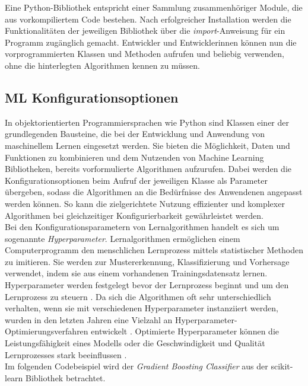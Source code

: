 \documentclass[german,bachelor]{swsLeipzig}
\begin{document}
Eine Python-Bibliothek entspricht einer Sammlung zusammenhöriger Module, die aus vorkompiliertem Code bestehen.
Nach erfolgreicher Installation werden die Funktionalitäten der jeweiligen Bibliothek über die \textit{import}-Anweisung für ein Programm zugänglich
gemacht.
Entwickler und Entwicklerinnen können nun die vorprogrammierten Klassen und Methoden aufrufen und beliebig verwenden,
ohne die hinterlegten Algorithmen kennen zu müssen.

\subsection{ML Konfigurationsoptionen} \label{ML Konfigurationsoptionen}
In objektorientierten Programmiersprachen wie Python sind Klassen einer der grundlegenden Bausteine, die bei der Entwicklung und Anwendung
von maschinellem Lernen eingesetzt werden.
Sie bieten die Möglichkeit, Daten und Funktionen zu kombinieren und dem Nutzenden von Machine Learning Bibliotheken,
bereits vorformulierte Algorithmen aufzurufen.
Dabei werden die Konfigurationsoptionen beim Aufruf der jeweiligen Klasse als Parameter übergeben, sodass die Algorithmen
an die Bedürfnisse des Anwendenen angepasst werden können.
So kann die zielgerichtete Nutzung effizienter und komplexer Algorithmen bei gleichzeitiger Konfigurierbarkeit gewährleistet werden. \\

Bei den Konfigurationsparametern von Lernalgorithmen handelt es sich um sogenannte \textit{Hyperparameter}.
Lernalgorithmen ermöglichen einem Computerprogramm den menschlichen Lernprozess mittels statistischer Methoden zu imitieren.
Sie werden zur Mustererkennung, Klassifizierung und Vorhersage verwendet, indem sie aus einem vorhandenen Trainingsdatensatz
lernen.
Hyperparameter werden festgelegt bevor der Lernprozess beginnt und um den Lernprozess zu steuern \cite[S. 280]{hype}.
Da sich die Algorithmen oft sehr unterschiedlich verhalten, wenn sie mit verschiedenen Hyperparameter instanziiert werden,
wurden in den letzten Jahren eine Vielzahl an Hyperparameter-Optimierungsverfahren entwickelt \cite[S. 1]{pmlr-v32-hutter14}.
Optimierte Hyperparameter können die Leistungsfähigkeit eines Modells oder die Geschwindigkeit und Qualität Lernprozesses stark beeinflussen \cite[S. 280]{hype}.\\

Im folgenden Codebeispiel wird der \textit{Gradient Boosting Classifier} aus der scikit-learn Bibliothek betrachtet.\\
\end{document}
